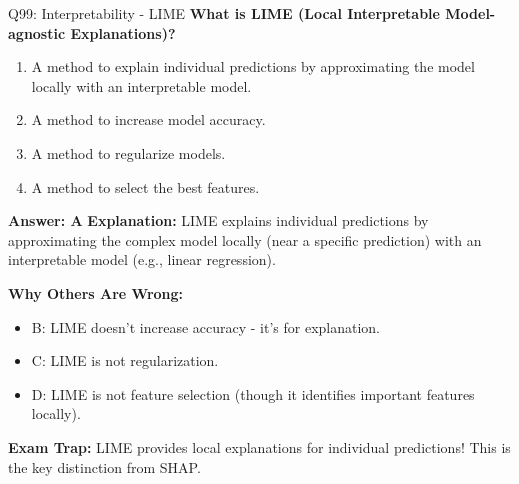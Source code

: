 \documentclass[8pt]{beamer}
\begin{document}
	\begin{frame}{Q99: Interpretability - LIME}
		\fontsize{6.5}{7.5}\selectfont
		\textbf{What is LIME (Local Interpretable Model-agnostic Explanations)?}
		
		\begin{enumerate}
			\item A method to explain individual predictions by approximating the model locally with an interpretable model.
			\item A method to increase model accuracy.
			\item A method to regularize models.
			\item A method to select the best features.
		\end{enumerate}
		
		\vspace{0.05cm}
		\textcolor{myblue}{\textbf{Answer: A}}
		\vspace{0.05cm}
		\textcolor{myblue}{\textbf{Explanation:}} LIME explains individual predictions by approximating the complex model locally (near a specific prediction) with an interpretable model (e.g., linear regression).
		
		\vspace{0.05cm}
		\textcolor{myred}{\textbf{Why Others Are Wrong:}}
		\begin{itemize}
			\item \textcolor{myred}{B:} LIME doesn't increase accuracy - it's for explanation.
			\item \textcolor{myred}{C:} LIME is not regularization.
			\item \textcolor{myred}{D:} LIME is not feature selection (though it identifies important features locally).
		\end{itemize}
		
		\textcolor{myred}{\textbf{Exam Trap:}} LIME provides \textcolor{myblue}{local explanations} for individual predictions! This is the key distinction from SHAP.
	\end{frame}
	
\end{document}
